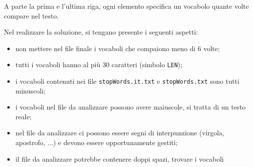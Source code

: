 A parte la prima e l'ultima riga, ogni elemento specifica un vocabolo quante volte compare nel testo.

Nel realizzare la soluzione, si tengano presente i seguenti aspetti:
\begin{itemize}
\item non mettere nel file finale i vocaboli che compaiono meno di 6 volte;
\item tutti i vocaboli hanno al pi\`u 30 caratteri (simbolo \texttt{LEN}); 
\item i vocaboli contenuti nei file \texttt{stopWords.it.txt} e \texttt{stopWords.txt} sono tutti minuscoli;
\item i vocaboli nel file da analizzare possono avere maiuscole, si tratta di un testo reale;
\item nel file da analizzare ci possono essere segni di interpunzione (virgola, apostrofo, ...) e devono essere opportunamente gestiti;
\item il file da analizzare potrebbe contenere doppi spazi, trovare i vocaboli 
\end{itemize}

